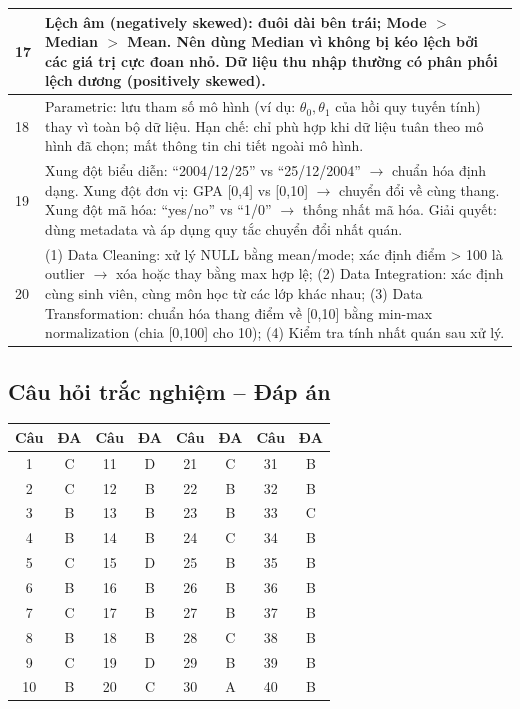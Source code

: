 \documentclass[10pt]{article}
\begin{document}
\begin{singlespace}
\begin{longtable}{|p{}|p{}|}
\hline
17 & Lệch âm (negatively skewed): đuôi dài bên trái; Mode $>$ Median $>$ Mean. Nên dùng Median vì không bị kéo lệch bởi các giá trị cực đoan nhỏ. Dữ liệu thu nhập thường có phân phối lệch dương (positively skewed). \\
\hline
18 & Parametric: lưu tham số mô hình (ví dụ: $\theta_0, \theta_1$ của hồi quy tuyến tính) thay vì toàn bộ dữ liệu. Hạn chế: chỉ phù hợp khi dữ liệu tuân theo mô hình đã chọn; mất thông tin chi tiết ngoài mô hình. \\
\hline
19 & Xung đột biểu diễn: ``2004/12/25'' vs ``25/12/2004'' $\to$ chuẩn hóa định dạng. Xung đột đơn vị: GPA [0,4] vs [0,10] $\to$ chuyển đổi về cùng thang. Xung đột mã hóa: ``yes/no'' vs ``1/0'' $\to$ thống nhất mã hóa. Giải quyết: dùng metadata và áp dụng quy tắc chuyển đổi nhất quán. \\
\hline
20 & (1) Data Cleaning: xử lý NULL bằng mean/mode; xác định điểm > 100 là outlier $\to$ xóa hoặc thay bằng max hợp lệ; (2) Data Integration: xác định cùng sinh viên, cùng môn học từ các lớp khác nhau; (3) Data Transformation: chuẩn hóa thang điểm về [0,10] bằng min-max normalization (chia [0,100] cho 10); (4) Kiểm tra tính nhất quán sau xử lý. \\
\hline
\end{longtable}
\end{singlespace}

\subsection*{Câu hỏi trắc nghiệm -- Đáp án}

\begin{singlespace}
\begin{longtable}{|c|c||c|c||c|c||c|c|}
\hline
\textbf{Câu} & \textbf{ĐA} & \textbf{Câu} & \textbf{ĐA} & \textbf{Câu} & \textbf{ĐA} & \textbf{Câu} & \textbf{ĐA} \\
\hline
\endhead
1 & C & 11 & D & 21 & C & 31 & B \\
\hline
2 & C & 12 & B & 22 & B & 32 & B \\
\hline
3 & B & 13 & B & 23 & B & 33 & C \\
\hline
4 & B & 14 & B & 24 & C & 34 & B \\
\hline
5 & C & 15 & D & 25 & B & 35 & B \\
\hline
6 & B & 16 & B & 26 & B & 36 & B \\
\hline
7 & C & 17 & B & 27 & B & 37 & B \\
\hline
8 & B & 18 & B & 28 & C & 38 & B \\
\hline
9 & C & 19 & D & 29 & B & 39 & B \\
\hline
10 & B & 20 & C & 30 & A & 40 & B \\
\hline
\end{longtable}
\end{singlespace}
\end{document}
